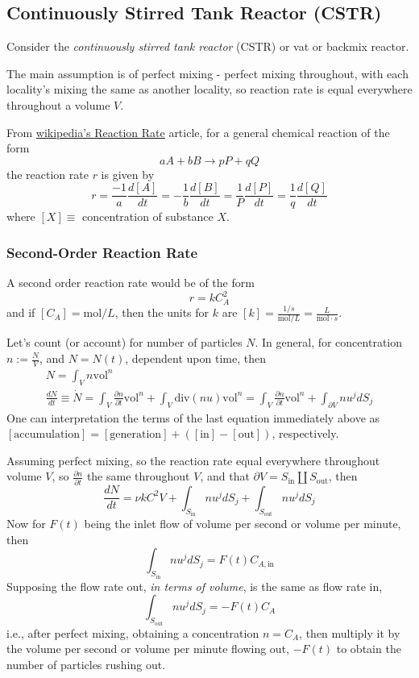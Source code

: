 \documentclass[10pt]{amsart}
\begin{document}
\begin{multicols*}{2}
\subsection{Continuously Stirred Tank Reactor (CSTR)}

Consider the \emph{continuously stirred tank reactor} (CSTR) or vat or backmix reactor.  

The main assumption is of perfect mixing - perfect mixing throughout, with each locality's mixing the same as another locality, so reaction rate is equal everywhere throughout a volume $V$.  

From \href{https://en.wikipedia.org/wiki/Reaction_rate}{wikipedia's Reaction Rate} article, for a general chemical reaction of the form
\[
aA + bB \to pP + qQ
\]
the reaction rate $r$ is given by 
\[
r = \frac{-1}{a} \frac{d[A]}{dt} = - \frac{1}{b} \frac{d[B]}{dt} = \frac{1}{P} \frac{d[P]}{dt} = \frac{1}{q} \frac{d[Q]}{dt}
\]
where $[X] \equiv $ concentration of substance $X$.  

\subsubsection{Second-Order Reaction Rate}

A second order reaction rate would be of the form
\[
r = kC_A^2
\]
and if $[C_A] = \text{mol}/L$, then the units for $k$ are $[k] = \frac{ 1/s}{ \text{mol}/L} = \frac{L}{ \text{mol}\cdot s}$.  


Let's count (or account) for number of particles $N$.  In general, for concentration $n:= \frac{N}{V}$, and $N=N(t)$, dependent upon time, then
\[
\begin{gathered}
  N = \int_V n \text{vol}^n  \\
  \frac{dN}{dt} \equiv \dot{N} = \int_V \frac{ \partial n}{ \partial t} \text{vol}^n + \int_V \text{div}(nu) \text{vol}^n = \int_V \frac{ \partial n}{ \partial t} \text{vol}^n + \int_{\partial V} nu^j dS_j 
\end{gathered}
\]
One can interpretation the terms of the last equation immediately above as $[\text{accumulation}] = [\text{generation}] + ([\text{in}] - [\text{out}])$, respectively.  

Assuming perfect mixing, so the reaction rate equal everywhere throughout volume $V$, so $\frac{ \partial n}{ \partial t}$ the same throughout $V$, and that $\partial V = S_{\text{in}} \coprod S_{\text{out}}$, then
\[
\frac{dN}{dt} = \nu k C^2 V + \int_{S_{\text{in}} } nu^j dS_j + \int_{S_{\text{out}}} nu^j dS_j
\]
Now for $F(t)$ being the inlet flow of volume per second or volume per minute, then
\[
\int_{S_{\text{in}}} nu^j dS_j = F(t) C_{A,\text{in}}
\]
Supposing the flow rate out, \emph{in terms of volume}, is the same as flow rate in,
\[
\int_{S_{\text{out}} } nu^j dS_j = -F(t) C_A
\]
i.e., after perfect mixing, obtaining a concentration $n=C_A$, then multiply it by the volume per second or volume per minute flowing out, $-F(t)$ to obtain the number of particles rushing out.  


\end{multicols*}
\end{document}
